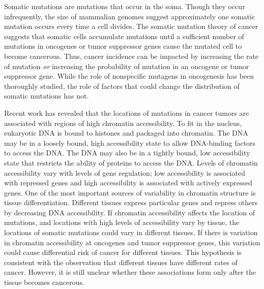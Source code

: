 
Somatic mutations are mutations that occur in the soma.
Though they occur infrequently, the size of mammalian genomes suggest approximately one somatic mutation occurs every time a cell divides.
The somatic mutation theory of cancer suggests that somatic cells accumulate mutations until a sufficient number of mutations in oncogenes or tumor suppressor genes cause the mutated cell to become cancerous.
Thus, cancer incidence can be impacted by increasing the rate of mutation \textit{or} increasing the probability of mutation in an oncogene or tumor suppressor gene.
While the role of nonspecific mutagens in oncogenesis has been thoroughly studied, the role of factors that could change the distribution of somatic mutations has not.

Recent work has revealed that the locations of mutations in cancer tumors are associated with regions of high chromatin accessibility.
To fit in the nucleus, eukaryotic DNA is bound to histones and packaged into chromatin.
The DNA may be in a loosely bound, high accessibility state to allow DNA-binding factors to access the DNA.
The DNA may also be in a tightly bound, low accessibility state that restricts the ability of proteins to access the DNA.
Levels of chromatin accessibility vary with levels of gene regulation; low accessibility is associated with repressed genes and high accessibility is associated with actively expressed genes.
One of the most important sources of variability in chromatin structure is tissue differentiation.
Different tissues express particular genes and repress others by decreasing DNA accessibility.
If chromatin accessibility affects the location of mutations, and locations with high levels of accessibility vary by tissue, the locations of somatic mutations could vary in different tissues.
If there is variation in chromatin accessibility at oncogenes and tumor suppressor genes, this variation could cause differential risk of cancer for different tissues.
This hypothesis is consistent with the observation that different tissues have different rates of cancer.
However, it is still unclear whether these associations form only after the tissue becomes cancerous. 


